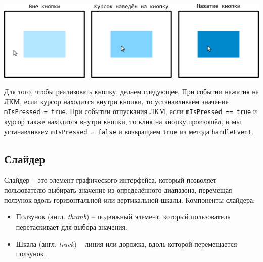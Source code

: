 \documentclass{article}
\begin{document}
\begin{center}
\includegraphics[scale=0.9]{../images/button.png}
\end{center}
Для того, чтобы реализовать кнопку, делаем следующее. При событии нажатия на ЛКМ, если курсор находится внутри кнопки, то устанавливаем значение \texttt{mIsPressed = true}. При событии отпускания ЛКМ, если \texttt{mIsPressed == true} и курсор также находится внутри кнопки, то клик на кнопку произошёл, и мы устанавливаем \texttt{mIsPressed = false} и возвращаем \texttt{true} из метода \texttt{handleEvent}.


\clearpage
\subsection*{Слайдер}
Слайдер -- это элемент графического интерфейса, который позволяет пользователю выбирать значение из определённого диапазона, перемещая ползунок вдоль горизонтальной или вертикальной шкалы. Компоненты слайдера:
\begin{itemize}
\item Ползунок (англ. \textit{thumb}) -- подвижный элемент, который пользователь перетаскивает для выбора значения.
\item Шкала (англ. \textit{track}) -- линия или дорожка, вдоль которой перемещается ползунок.
\end{itemize}
\quad
\end{document}
